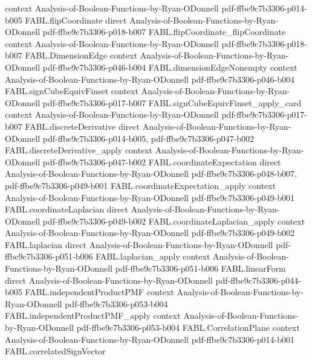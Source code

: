 \begin{theorem}
  {context}
  {Analysis-of-Boolean-Functions-by-Ryan-ODonnell}
  {pdf-ffbe9c7b3306-p014-b005}
\proofstep
  {FABL.flipCoordinate}
  {direct}
  {Analysis-of-Boolean-Functions-by-Ryan-ODonnell}
  {pdf-ffbe9c7b3306-p018-b007}
\proofstep
  {FABL.flipCoordinate_flipCoordinate}
  {context}
  {Analysis-of-Boolean-Functions-by-Ryan-ODonnell}
  {pdf-ffbe9c7b3306-p018-b007}
\proofstep
  {FABL.DimensionEdge}
  {context}
  {Analysis-of-Boolean-Functions-by-Ryan-ODonnell}
  {pdf-ffbe9c7b3306-p046-b004}
\proofstep
  {FABL.dimensionEdgeNonempty}
  {context}
  {Analysis-of-Boolean-Functions-by-Ryan-ODonnell}
  {pdf-ffbe9c7b3306-p046-b004}
\proofstep
  {FABL.signCubeEquivFinset}
  {context}
  {Analysis-of-Boolean-Functions-by-Ryan-ODonnell}
  {pdf-ffbe9c7b3306-p017-b007}
\proofstep
  {FABL.signCubeEquivFinset_apply_card}
  {context}
  {Analysis-of-Boolean-Functions-by-Ryan-ODonnell}
  {pdf-ffbe9c7b3306-p017-b007}
\proofstep
  {FABL.discreteDerivative}
  {direct}
  {Analysis-of-Boolean-Functions-by-Ryan-ODonnell}
  {pdf-ffbe9c7b3306-p014-b005,
    pdf-ffbe9c7b3306-p047-b002}
\proofstep
  {FABL.discreteDerivative_apply}
  {context}
  {Analysis-of-Boolean-Functions-by-Ryan-ODonnell}
  {pdf-ffbe9c7b3306-p047-b002}
\proofstep
  {FABL.coordinateExpectation}
  {direct}
  {Analysis-of-Boolean-Functions-by-Ryan-ODonnell}
  {pdf-ffbe9c7b3306-p048-b007,
    pdf-ffbe9c7b3306-p049-b001}
\proofstep
  {FABL.coordinateExpectation_apply}
  {context}
  {Analysis-of-Boolean-Functions-by-Ryan-ODonnell}
  {pdf-ffbe9c7b3306-p049-b001}
\proofstep
  {FABL.coordinateLaplacian}
  {direct}
  {Analysis-of-Boolean-Functions-by-Ryan-ODonnell}
  {pdf-ffbe9c7b3306-p049-b002}
\proofstep
  {FABL.coordinateLaplacian_apply}
  {context}
  {Analysis-of-Boolean-Functions-by-Ryan-ODonnell}
  {pdf-ffbe9c7b3306-p049-b002}
\proofstep
  {FABL.laplacian}
  {direct}
  {Analysis-of-Boolean-Functions-by-Ryan-ODonnell}
  {pdf-ffbe9c7b3306-p051-b006}
\proofstep
  {FABL.laplacian_apply}
  {context}
  {Analysis-of-Boolean-Functions-by-Ryan-ODonnell}
  {pdf-ffbe9c7b3306-p051-b006}
\proofstep
  {FABL.linearForm}
  {direct}
  {Analysis-of-Boolean-Functions-by-Ryan-ODonnell}
  {pdf-ffbe9c7b3306-p044-b005}
\proofstep
  {FABL.independentProductPMF}
  {context}
  {Analysis-of-Boolean-Functions-by-Ryan-ODonnell}
  {pdf-ffbe9c7b3306-p053-b004}
\proofstep
  {FABL.independentProductPMF_apply}
  {context}
  {Analysis-of-Boolean-Functions-by-Ryan-ODonnell}
  {pdf-ffbe9c7b3306-p053-b004}
\proofstep
  {FABL.CorrelationPlane}
  {context}
  {Analysis-of-Boolean-Functions-by-Ryan-ODonnell}
  {pdf-ffbe9c7b3306-p014-b001}
\proofstep
  {FABL.correlatedSignVector}

\end{theorem}
